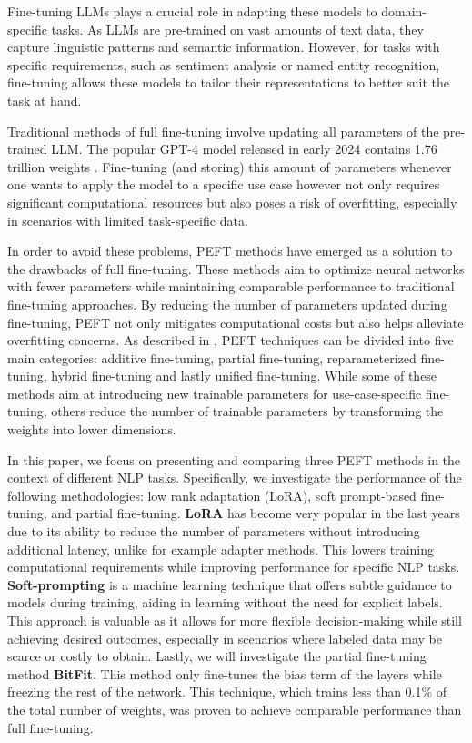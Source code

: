 Fine-tuning LLMs plays a crucial role in adapting these models to domain-specific tasks. As LLMs are pre-trained on vast amounts of text data, they capture linguistic patterns and semantic information. However, for tasks with specific requirements, such as sentiment analysis or named entity recognition, fine-tuning allows these models to tailor their representations to better suit the task at hand. 

Traditional methods of full fine-tuning involve updating all parameters of the pre-trained LLM. The popular GPT-4 model released in early 2024 contains 1.76 trillion weights \cite{openai2024gpt4}. Fine-tuning (and storing) this amount of parameters whenever one wants to apply the model to a specific use case however not only requires significant computational resources but also poses a risk of overfitting, especially in scenarios with limited task-specific data.

\noindent In order to avoid these problems, PEFT methods have emerged as a solution to the drawbacks of full fine-tuning. These methods aim to optimize neural networks with fewer parameters while maintaining comparable performance to traditional fine-tuning approaches. By reducing the number of parameters updated during fine-tuning, PEFT not only mitigates computational costs but also helps alleviate overfitting concerns. As described in \cite{xu2023parameterefficient}, PEFT techniques can be divided into five main categories: additive fine-tuning, partial fine-tuning, reparameterized fine-tuning, hybrid fine-tuning and lastly unified fine-tuning. While some of these methods aim at introducing new trainable parameters for use-case-specific fine-tuning, others reduce the number of trainable parameters by transforming the weights into lower dimensions.

In this paper, we focus on presenting and comparing three PEFT methods in the context of different NLP tasks. Specifically, we investigate the performance of the following methodologies: low rank adaptation (LoRA), soft prompt-based fine-tuning, and partial fine-tuning. \textbf{LoRA} \cite{hu2021lora} has become very popular in the last years due to its ability to reduce the number of parameters without introducing additional latency, unlike for example adapter methods. This lowers training computational requirements while improving performance for specific NLP tasks. \textbf{Soft-prompting} \cite{lester2021power} is a machine learning technique that offers subtle guidance to models during training, aiding in learning without the need for explicit labels. This approach is valuable as it allows for more flexible decision-making while still achieving desired outcomes, especially in scenarios where labeled data may be scarce or costly to obtain. Lastly, we will investigate the partial fine-tuning method \textbf{BitFit}\cite{zaken2022bitfit}. This method only fine-tunes the bias term of the layers while freezing the rest of the network. This technique, which trains less than 0.1\% of the total number of weights, was proven to achieve comparable performance than full fine-tuning.

